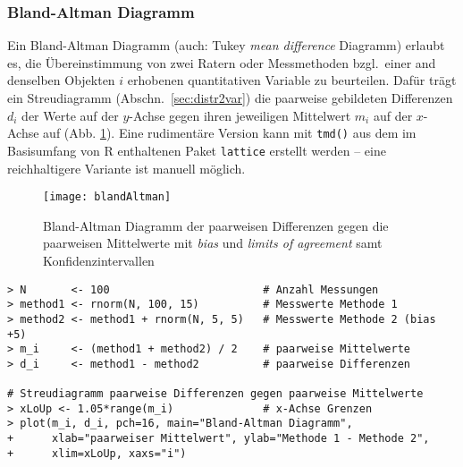 \subsubsection{Bland-Altman Diagramm}

Ein Bland-Altman Diagramm (auch: Tukey \emph{mean difference} Diagramm) erlaubt es, die Übereinstimmung von zwei Ratern oder Messmethoden bzgl.\ einer and denselben Objekten $i$ erhobenen quantitativen Variable zu beurteilen. Dafür trägt ein Streudiagramm (Abschn.\ \ref{sec:distr2var}) die paarweise gebildeten Differenzen $d_{i}$ der Werte auf der $y$-Achse gegen ihren jeweiligen Mittelwert $m_{i}$ auf der $x$-Achse auf (Abb. \ref{fig:blandAltman}). Eine rudimentäre Version kann mit \lstinline!tmd()! aus dem im Basisumfang von R enthaltenen Paket \lstinline!lattice! \cite{Sarkar2008} erstellt werden -- eine reichhaltigere Variante ist manuell möglich.

\begin{figure}[ht]
\centering
\texttt{[image: blandAltman]}
\vspace*{-0.5em}
\caption{Bland-Altman Diagramm der paarweisen Differenzen gegen die paarweisen Mittelwerte mit \emph{bias} und \emph{limits of agreement} samt Konfidenzintervallen}
\label{fig:blandAltman}
\end{figure}

\begin{lstlisting}
> N       <- 100                        # Anzahl Messungen
> method1 <- rnorm(N, 100, 15)          # Messwerte Methode 1
> method2 <- method1 + rnorm(N, 5, 5)   # Messwerte Methode 2 (bias +5)
> m_i     <- (method1 + method2) / 2    # paarweise Mittelwerte
> d_i     <- method1 - method2          # paarweise Differenzen

# Streudiagramm paarweise Differenzen gegen paarweise Mittelwerte
> xLoUp <- 1.05*range(m_i)              # x-Achse Grenzen
> plot(m_i, d_i, pch=16, main="Bland-Altman Diagramm",
+      xlab="paarweiser Mittelwert", ylab="Methode 1 - Methode 2",
+      xlim=xLoUp, xaxs="i")
\end{lstlisting}

